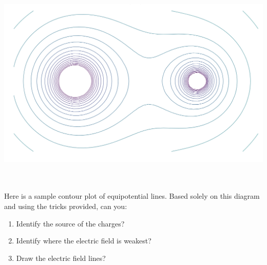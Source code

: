 \begin{center}
\includegraphics[scale=0.7]{Figures/Figure22}
\end{center}
\\\\
Here is a sample contour plot of equipotential lines. Based solely on this diagram and using the tricks provided, can you:
\begin{enumerate}
    \item Identify the source of the charges?
    \item Identify where the electric field is weakest?
    \item Draw the electric field lines?
\end{enumerate}
